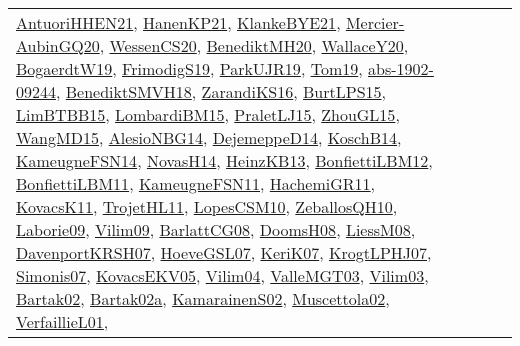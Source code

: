 {\begin{longtable}{lp{3cm}>{\raggedright}p{6cm}>{\raggedright}p{6cm}p{8cm}}
\href{papers/AntuoriHHEN21.pdf}{AntuoriHHEN21}\cite{AntuoriHHEN21}, \href{papers/HanenKP21.pdf}{HanenKP21}\cite{HanenKP21}, \href{papers/KlankeBYE21.pdf}{KlankeBYE21}\cite{KlankeBYE21}, \href{papers/Mercier-AubinGQ20.pdf}{Mercier-AubinGQ20}\cite{Mercier-AubinGQ20}, \href{papers/WessenCS20.pdf}{WessenCS20}\cite{WessenCS20}, \href{articles/BenediktMH20.pdf}{BenediktMH20}\cite{BenediktMH20}, \href{articles/WallaceY20.pdf}{WallaceY20}\cite{WallaceY20}, \href{papers/BogaerdtW19.pdf}{BogaerdtW19}\cite{BogaerdtW19}, \href{papers/FrimodigS19.pdf}{FrimodigS19}\cite{FrimodigS19}, \href{papers/ParkUJR19.pdf}{ParkUJR19}\cite{ParkUJR19}, \href{papers/Tom19.pdf}{Tom19}\cite{Tom19}, \href{articles/abs-1902-09244.pdf}{abs-1902-09244}\cite{abs-1902-09244}, \href{papers/BenediktSMVH18.pdf}{BenediktSMVH18}\cite{BenediktSMVH18}, \href{articles/ZarandiKS16.pdf}{ZarandiKS16}\cite{ZarandiKS16}, \href{papers/BurtLPS15.pdf}{BurtLPS15}\cite{BurtLPS15}, \href{papers/LimBTBB15.pdf}{LimBTBB15}\cite{LimBTBB15}, \href{papers/LombardiBM15.pdf}{LombardiBM15}\cite{LombardiBM15}, \href{papers/PraletLJ15.pdf}{PraletLJ15}\cite{PraletLJ15}, \href{papers/ZhouGL15.pdf}{ZhouGL15}\cite{ZhouGL15}, \href{articles/WangMD15.pdf}{WangMD15}\cite{WangMD15}, \href{papers/AlesioNBG14.pdf}{AlesioNBG14}\cite{AlesioNBG14}, \href{papers/DejemeppeD14.pdf}{DejemeppeD14}\cite{DejemeppeD14}, \href{papers/KoschB14.pdf}{KoschB14}\cite{KoschB14}, \href{articles/KameugneFSN14.pdf}{KameugneFSN14}\cite{KameugneFSN14}, \href{articles/NovasH14.pdf}{NovasH14}\cite{NovasH14}, \href{papers/HeinzKB13.pdf}{HeinzKB13}\cite{HeinzKB13}, \href{papers/BonfiettiLBM12.pdf}{BonfiettiLBM12}\cite{BonfiettiLBM12}, \href{papers/BonfiettiLBM11.pdf}{BonfiettiLBM11}\cite{BonfiettiLBM11}, \href{papers/KameugneFSN11.pdf}{KameugneFSN11}\cite{KameugneFSN11}, \href{articles/HachemiGR11.pdf}{HachemiGR11}\cite{HachemiGR11}, \href{articles/KovacsK11.pdf}{KovacsK11}\cite{KovacsK11}, \href{articles/TrojetHL11.pdf}{TrojetHL11}\cite{TrojetHL11}, \href{articles/LopesCSM10.pdf}{LopesCSM10}\cite{LopesCSM10}, \href{articles/ZeballosQH10.pdf}{ZeballosQH10}\cite{ZeballosQH10}, \href{papers/Laborie09.pdf}{Laborie09}\cite{Laborie09}, \href{papers/Vilim09.pdf}{Vilim09}\cite{Vilim09}, \href{papers/BarlattCG08.pdf}{BarlattCG08}\cite{BarlattCG08}, \href{papers/DoomsH08.pdf}{DoomsH08}\cite{DoomsH08}, \href{articles/LiessM08.pdf}{LiessM08}\cite{LiessM08}, \href{papers/DavenportKRSH07.pdf}{DavenportKRSH07}\cite{DavenportKRSH07}, \href{papers/HoeveGSL07.pdf}{HoeveGSL07}\cite{HoeveGSL07}, \href{papers/KeriK07.pdf}{KeriK07}\cite{KeriK07}, \href{papers/KrogtLPHJ07.pdf}{KrogtLPHJ07}\cite{KrogtLPHJ07}, \href{articles/Simonis07.pdf}{Simonis07}\cite{Simonis07}, \href{papers/KovacsEKV05.pdf}{KovacsEKV05}\cite{KovacsEKV05}, \href{papers/Vilim04.pdf}{Vilim04}\cite{Vilim04}, \href{papers/ValleMGT03.pdf}{ValleMGT03}\cite{ValleMGT03}, \href{papers/Vilim03.pdf}{Vilim03}\cite{Vilim03}, \href{papers/Bartak02.pdf}{Bartak02}\cite{Bartak02}, \href{papers/Bartak02a.pdf}{Bartak02a}\cite{Bartak02a}, \href{papers/KamarainenS02.pdf}{KamarainenS02}\cite{KamarainenS02}, \href{papers/Muscettola02.pdf}{Muscettola02}\cite{Muscettola02}, \href{papers/VerfaillieL01.pdf}{VerfaillieL01}\cite{VerfaillieL01}, 
\end{longtable}}
